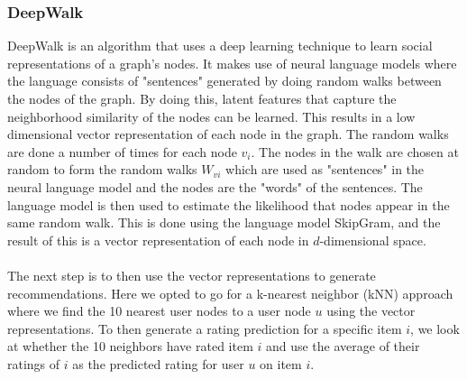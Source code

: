 \subsubsection{DeepWalk}
DeepWalk is an algorithm that uses a deep learning technique to learn social representations of a graph's nodes\cite{DeepWalk}.
It makes use of neural language models where the language consists of "sentences" generated by doing random walks between the nodes of the graph.
By doing this, latent features that capture the neighborhood similarity of the nodes can be learned.
This results in a low dimensional vector representation of each node in the graph.
The random walks are done a number of times for each node $v_i$.
The nodes in the walk are chosen at random to form the random walks $W_{vi}$ which are used as "sentences" in the neural language model and the nodes are the "words" of the sentences.
The language model is then used to estimate the likelihood that nodes appear in the same random walk.
This is done using the language model SkipGram, and the result of this is a vector representation of each node in $d$-dimensional space.
\\\\
The next step is to then use the vector representations to generate recommendations.
Here we opted to go for a k-nearest neighbor (kNN) approach where we find the 10 nearest user nodes to a user node $u$ using the vector representations.
To then generate a rating prediction for a specific item $i$, we look at whether the 10 neighbors have rated item $i$ and use the average of their ratings of $i$ as the predicted rating for user $u$ on item $i$.
